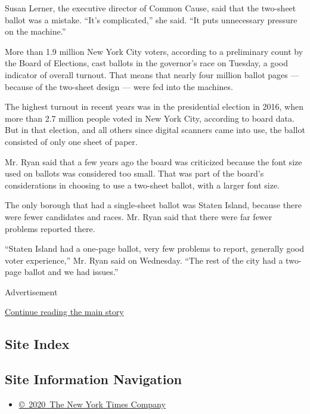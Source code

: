 Susan Lerner, the executive director of Common Cause, said that the
two-sheet ballot was a mistake. ``It's complicated,'' she said. ``It
puts unnecessary pressure on the machine.''

More than 1.9 million New York City voters, according to a preliminary
count by the Board of Elections, cast ballots in the governor's race on
Tuesday, a good indicator of overall turnout. That means that nearly
four million ballot pages --- because of the two-sheet design --- were
fed into the machines.

The highest turnout in recent years was in the presidential election in
2016, when more than 2.7 million people voted in New York City,
according to board data. But in that election, and all others since
digital scanners came into use, the ballot consisted of only one sheet
of paper.

Mr. Ryan said that a few years ago the board was criticized because the
font size used on ballots was considered too small. That was part of the
board's considerations in choosing to use a two-sheet ballot, with a
larger font size.

The only borough that had a single-sheet ballot was Staten Island,
because there were fewer candidates and races. Mr. Ryan said that there
were far fewer problems reported there.

``Staten Island had a one-page ballot, very few problems to report,
generally good voter experience,'' Mr. Ryan said on Wednesday. ``The
rest of the city had a two-page ballot and we had issues.''

Advertisement

\protect\hyperlink{after-bottom}{Continue reading the main story}

\hypertarget{site-index}{%
\subsection{Site Index}\label{site-index}}

\hypertarget{site-information-navigation}{%
\subsection{Site Information
Navigation}\label{site-information-navigation}}

\begin{itemize}
\tightlist
\item
  \href{https://help.nytimes.com/hc/en-us/articles/115014792127-Copyright-notice}{©~2020~The
  New York Times Company}
\end{itemize}

